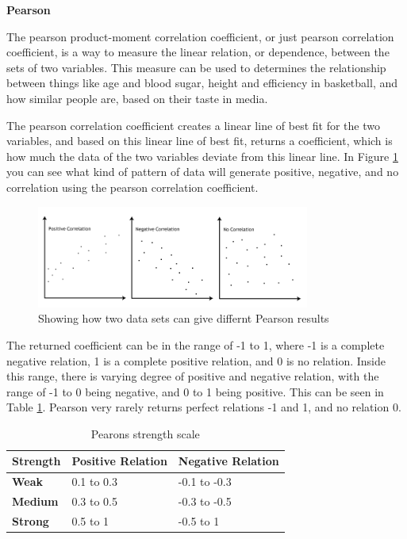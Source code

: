 \textbf{Pearson}

The pearson product-moment correlation coefficient, or just pearson correlation coefficient, is a way to measure the linear relation, or dependence, between the sets of two variables. This measure can be used to determines the relationship between things like age and blood sugar, height and efficiency in basketball, and how similar people are, based on their taste in media.

The pearson correlation coefficient creates a linear line of best fit for the two variables, and based on this linear line of best fit, returns a coefficient, which is how much the data of the two variables deviate from this linear line. In Figure \ref{Pearson2} you can see what kind of pattern of data will generate positive, negative, and no correlation using the pearson correlation coefficient.

\begin{figure}[htb]
\centering
\includegraphics[width=0.8\textwidth]{Images/pearson2.png}
\caption{Showing how two data sets can give differnt Pearson results}
\label{Pearson2}
\end{figure}

The returned coefficient can be in the range of -1 to 1, where -1 is a complete negative relation, 1 is a complete positive relation, and 0 is no relation. Inside this range, there is varying degree of positive and negative relation, with the range of -1 to 0 being negative, and 0 to 1 being positive. This can be seen in Table \ref{PearsonStr}. Pearson very rarely returns perfect relations -1 and 1, and no relation 0.

\begin{table}[htb]
\centering
\begin{tabular}{|l|l|l|} \hline
	\textbf{Strength} & \textbf{Positive Relation} & \textbf{Negative Relation} \\ \hline
	\textbf{Weak} & 0.1 to 0.3 & -0.1 to -0.3 \\ \hline
	\textbf{Medium} & 0.3 to 0.5 & -0.3 to -0.5 \\ \hline
	\textbf{Strong} & 0.5 to 1 & -0.5 to 1 \\ \hline
\end{tabular}
\caption{Pearons strength scale}
\label{PearsonStr}
\end{table}

